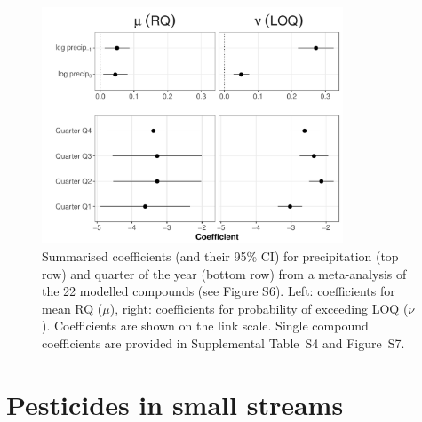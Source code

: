 \documentclass[pdftex,
	a4paper,
	titlepage=false]{scrreprt}
\begin{document}
\begin{figure}[ht]
\centering
  \includegraphics[width=0.8\textwidth]{mean_coef.pdf}
  \caption[Summarised coefficients (and their 95\% CI) for precipitation and quarter of the year]{Summarised coefficients (and their 95\% CI) for precipitation (top row) and quarter of the year (bottom row) from a meta-analysis of the 22 modelled compounds (see Figure S6). Left: coefficients for mean RQ ($\mu$), right: coefficients for probability of exceeding LOQ ($\nu$). 
  Coefficients are shown on the link scale.
  Single compound coefficients are provided in Supplemental Table~S4 and Figure~S7.
  }
  \label{fig:mean_coefs}
\end{figure}


\chapter{Pesticides in small streams}

\end{document}
